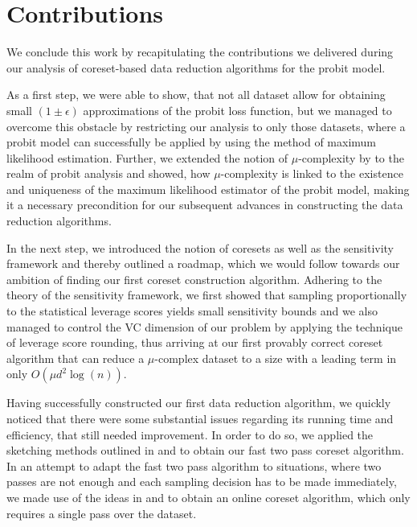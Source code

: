 \section{Contributions}

We conclude this work by recapitulating the contributions we delivered
during our analysis of coreset-based data reduction algorithms
for the probit model.

As a first step, we were able to show, that not all dataset allow
for obtaining small $(1 \pm \epsilon)$ approximations of the
probit loss function, but we
managed to overcome this obstacle by restricting our analysis to only
those datasets, where a probit model can successfully be applied
by using the method of maximum likelihood estimation.
Further, we extended the notion of $\mu$-complexity by
\cite{on-coresets} to the realm of probit analysis and showed, how
$\mu$-complexity is linked to the existence and uniqueness of the
maximum likelihood estimator of the probit model, making it a
necessary precondition for our subsequent advances in constructing the
data reduction algorithms.

In the next step, we introduced the notion of coresets as well as
the sensitivity framework and thereby outlined a roadmap, which we
would follow towards our ambition of finding our first coreset
construction algorithm.
Adhering to the theory of the sensitivity framework, we first
showed that sampling proportionally to the statistical leverage
scores yields small sensitivity bounds and we also managed to
control the VC dimension of our problem
by applying the technique of leverage
score rounding, thus arriving at our first provably correct
coreset algorithm that can reduce a $\mu$-complex dataset to
a size with a leading term in only $O(\mu d^2 \log(n))$.

Having successfully constructed our first data reduction algorithm,
we quickly noticed that there were some substantial issues regarding
its running time and efficiency,
that still needed improvement. In order to do so, we applied the sketching
methods outlined in \cite{leverage-scores-drineas} and
\cite{woodruff-2017} to obtain our fast two pass coreset algorithm.
In an attempt to adapt the fast two pass algorithm to situations,
where two passes are not enough and each sampling decision has to
be made immediately, we made use of the ideas in
\cite{online-row-sampling} and \cite{tensor-factorization}
to obtain an online coreset algorithm, which only requires a single
pass over the dataset.

